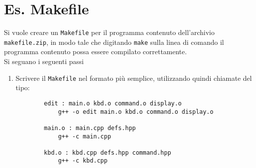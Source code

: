 \section*{Es. Makefile}
Si vuole creare un \texttt{Makefile} per il programma contenuto dell'archivio \texttt{makefile.zip}, in modo tale che digitando \texttt{make} sulla linea di comando il programma contenuto possa essere compilato correttamente.\\
Si seguano i seguenti passi
\begin{enumerate}
    \item Scrivere il \texttt{Makefile} nel formato pi\`u semplice, utilizzando quindi chiamate del tipo:
    \begin{verbatim}
        edit : main.o kbd.o command.o display.o
            g++ -o edit main.o kbd.o command.o display.o

        main.o : main.cpp defs.hpp
            g++ -c main.cpp

        kbd.o : kbd.cpp defs.hpp command.hpp
            g++ -c kbd.cpp


\end{verbatim}
\end{enumerate}
